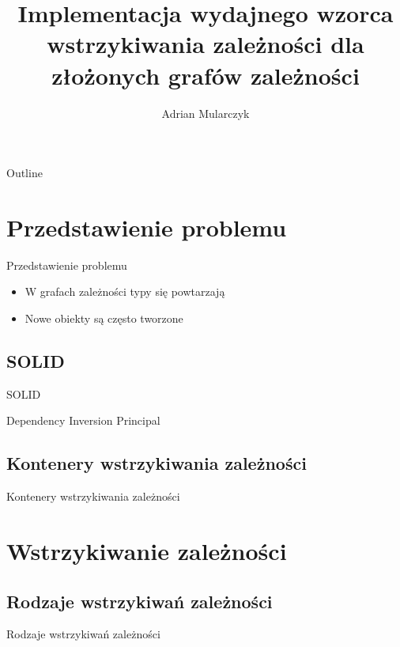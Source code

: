 \documentclass{beamer}
\title[]
{Implementacja wydajnego wzorca wstrzykiwania zależności dla złożonych grafów zależności}
\author[Adrian Mularczyk]
{Adrian Mularczyk}
\institute[Uniwersytet Wrocławski]
{
Uniwersytet Wrocławski\\
Wydział Matematyki i Informatyki\\
Kierunek: Informatyka
}
\date{}
\begin{document}
\begin{frame}
  \titlepage
\end{frame}

\begin{frame}{Outline}
  \tableofcontents
\end{frame}



\section{Przedstawienie problemu}

\begin{frame}{Przedstawienie problemu}
  \begin{itemize}
  \item
  	W grafach zależności typy się powtarzają
  \item
  	Nowe obiekty są często tworzone
  \end{itemize}
\end{frame}


\subsection{SOLID}

\begin{frame}{SOLID}
\end{frame}

\begin{frame}{Dependency Inversion Principal}
\end{frame}


\subsection{Kontenery wstrzykiwania zależności}

\begin{frame}{Kontenery wstrzykiwania zależności}
\end{frame}


\section{Wstrzykiwanie zależności}

\subsection{Rodzaje wstrzykiwań zależności}

\begin{frame}{Rodzaje wstrzykiwań zależności}
\end{frame}
\end{document}
